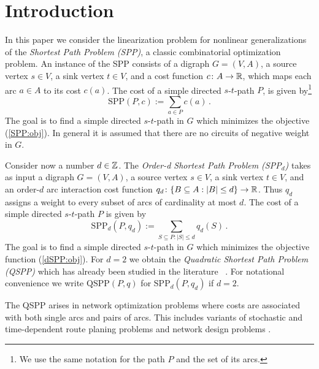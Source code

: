 \section{Introduction}\label{intro:sec}

In this paper we consider the linearization problem for 
nonlinear
generalizations of the  \emph{Shortest Path Problem (SPP)}, a classic
combinatorial optimization problem.
An instance of the SPP  consists  of a digraph $G = (V, A)$,  a source vertex $s \in V$, a sink vertex $t \in V$, and a
cost function $c\colon A\to \mathbb{R}$, which maps each arc $a\in A$ to its cost
$c(a)$.  The cost of a simple directed $s$-$t$-path $P$, 
is given by\footnote{We use the same  notation for the path $P$ and the set of its arcs.}
\begin{equation}\label{SPP:obj}  \text{SPP}(P,c):=\sum_{a\in P} c(a)\, .  \end{equation}
The goal  is to find a simple directed 
$s$-$t$-path in $G$ which minimizes the objective 
(\ref{SPP:obj}).
In general it is assumed that 
there are no circuits of negative weight in $G$. 


Consider now a number $d\in \mathbb{Z}$.  The \emph{Order-d Shortest Path Problem
  (SPP$_d$)}
 takes as input a  digraph $G = (V, A)$,  
  a source vertex $s \in V$, a sink vertex $t \in V$, and an order-$d$ arc interaction 
cost  function $q_d\colon \{ B \subseteq A : |B| \leq d \}
\to \mathbb{R}$. Thus $q_d$ assigns a  weight to every subset of
arcs of cardinality at most $d$.
 The cost of a simple directed $s$-$t$-path $P$ 
is given by
\begin{equation}\label{dSPP:obj}
  \text{SPP}_d(P,q_d):=\sum_{S\subseteq P \colon |S|\le d} q_d(S)\, .\end{equation}
The goal is to find  
a simple directed 
$s$-$t$-path in $G$ which minimizes the objective function (\ref{dSPP:obj}).
For $d=2$ we
obtain the   \emph{Quadratic  Shortest Path Problem (QSPP)} which has already been studied in the literature
~\cite{cela2021linearizable,huSo2018,huSo2020,rostami2018}. 
For notational convenience we write $\text{QSPP}(P,q)$ for $\text{SPP}_d(P,q_d)$ if $d=2$.


\smallskip

The QSPP arises 
in network optimization  problems where costs are associated with both single arcs and pairs of arcs.
This includes 
variants of stochastic and time-dependent route planing  problems  
\cite{nie2009reliable,sen2001mean,sivakumar1994variance}
and network design problems 
\cite{murakami1997restoration,gamvros2006satellite}. 

